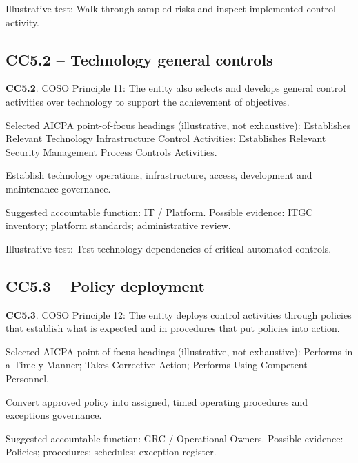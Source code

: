 \documentclass[10pt,oneside]{report}
\begin{document}
Illustrative test: Walk through sampled risks and inspect implemented control activity.

\subsection*{CC5.2 -- Technology general controls}
\begin{aicpabox}
\textbf{CC5.2}. COSO Principle 11: The entity also selects and develops general control activities over technology to support the achievement of objectives.\par{}
\end{aicpabox}
Selected AICPA point-of-focus headings (illustrative, not exhaustive): Establishes Relevant Technology Infrastructure Control Activities; Establishes Relevant Security Management Process Controls Activities.

\begin{engineeringbox}
Establish technology operations, infrastructure, access, development and maintenance governance.
\end{engineeringbox}
Suggested accountable function: IT / Platform. Possible evidence: ITGC inventory; platform standards; administrative review.

Illustrative test: Test technology dependencies of critical automated controls.

\subsection*{CC5.3 -- Policy deployment}
\begin{aicpabox}
\textbf{CC5.3}. COSO Principle 12: The entity deploys control activities through policies that establish what is expected and in procedures that put policies into action.\par{}
\end{aicpabox}
Selected AICPA point-of-focus headings (illustrative, not exhaustive): Performs in a Timely Manner; Takes Corrective Action; Performs Using Competent Personnel.

\begin{engineeringbox}
Convert approved policy into assigned, timed operating procedures and exceptions governance.
\end{engineeringbox}
Suggested accountable function: GRC / Operational Owners. Possible evidence: Policies; procedures; schedules; exception register.
\end{document}
